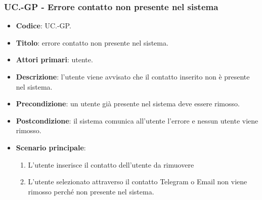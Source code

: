 			\subsubsection{UC\theuccount.\thesubuccount-GP - Errore contatto non presente nel sistema}

				\begin{itemize}
					\item \textbf{Codice}: UC\theuccount.\thesubuccount-GP.
					\item \textbf{Titolo}: errore contatto non presente nel sistema.
					\item \textbf{Attori primari}: utente.
					\item \textbf{Descrizione}: l’utente viene avvisato che il contatto inserito non è presente nel sistema.
					\item \textbf{Precondizione}: un utente già presente nel sistema deve essere rimosso.
					\item \textbf{Postcondizione}: il sistema comunica all’utente l’errore e nessun utente viene rimosso.
					\item \textbf{Scenario principale}:
					\begin{enumerate}
						\item L'utente inserisce il contatto dell'utente da rimuovere
						\item L'utente selezionato attraverso il contatto Telegram o Email non viene rimosso perché non presente nel sistema.
					\end{enumerate}
				\end{itemize}
